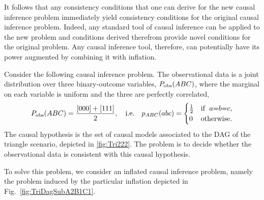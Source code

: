 It follows that any consistency conditions that one can derive for the new causal inference problem immediately yield consistency conditions for the original causal inference problem.  Indeed, any standard tool of causal inference can be applied to the new problem and conditions derived therefrom provide novel conditions for the original problem.  Any causal inference tool, therefore, can potentially have its power augmented by combining it with inflation.



\par\smallskip\nobreak

Consider the following causal inference problem.  The observational data is a joint distribution over three binary-outcome variables, $\pdf[\text{obs}]{A B C}$, where the marginal on each variable is uniform and the three are perfectly correlated,
\begin{align}\label{eq:ghzdistribution1}
\pdf[\text{obs}]{A B C}=\frac{[000]+[111]}{2},\quad\text{i.e.}\quad\p[ABC]{a b c}=\begin{cases}\tfrac{1}{2}&\text{if }\; a\eql b\eql c, \\ 0&\text{otherwise}.\end{cases}
\end{align}
The causal hypothesis is the set of causal models associated to the DAG of the triangle scenario, depicted in \cref{fig:Tri222}.  The problem is to decide whether the observational data is consistent with this causal hypothesis.

To solve this problem, we consider an inflated causal inference problem, namely the problem induced by the particular inflation depicted in Fig.~\ref{fig:TriDagSubA2B1C1}.  

